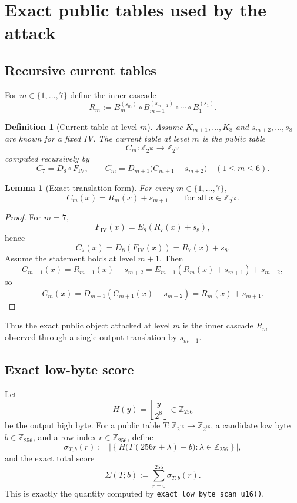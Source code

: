 \documentclass[11pt]{article}
\newtheorem{lemma}{Lemma}
\newtheorem{definition}{Definition}
\newcommand{\Z}[1]{\mathbb{Z}_{#1}}
\begin{document}
\section{Exact public tables used by the attack}
\subsection{Recursive current tables}
For $m\in\{1,\dots,7\}$ define the inner cascade
\[
R_m
:=
B_m^{(s_m)}
\circ B_{m-1}^{(s_{m-1})}
\circ \cdots \circ
B_1^{(s_1)}.
\]

\begin{definition}[Current table at level $m$]
Assume $K_{m+1},\dots,K_8$ and $s_{m+2},\dots,s_8$ are known for a fixed IV. The current table at level $m$ is the public table
\[
C_m:\Z{2^{16}}\to\Z{2^{16}}
\]
computed recursively by
\[
C_7=D_8\circ F_{\mathrm{IV}},
\qquad
C_m=D_{m+1}\bigl(C_{m+1}-s_{m+2}\bigr)
\quad (1\le m\le 6).
\]
\end{definition}

\begin{lemma}[Exact translation form]
\label{lem:current-table}
For every $m\in\{1,\dots,7\}$,
\[
C_m(x)=R_m(x)+s_{m+1}
\qquad\text{for all }x\in\Z{2^{16}}.
\]
\end{lemma}

\begin{proof}
For $m=7$,
\[
F_{\mathrm{IV}}(x)=E_8(R_7(x)+s_8),
\]
hence
\[
C_7(x)=D_8(F_{\mathrm{IV}}(x))=R_7(x)+s_8.
\]
Assume the statement holds at level $m+1$. Then
\[
C_{m+1}(x)=R_{m+1}(x)+s_{m+2}
=
E_{m+1}(R_m(x)+s_{m+1})+s_{m+2},
\]
so
\[
C_m(x)
=
D_{m+1}(C_{m+1}(x)-s_{m+2})
=
R_m(x)+s_{m+1}.
\]
\end{proof}

Thus the exact public object attacked at level $m$ is the inner cascade $R_m$ observed through a single output translation by $s_{m+1}$.

\subsection{Exact low-byte score}
Let
\[
H(y)=\left\lfloor\frac{y}{2^8}\right\rfloor\in\Z{256}
\]
be the output high byte. For a public table $T:\Z{2^{16}}\to\Z{2^{16}}$, a candidate low byte $b\in\Z{256}$, and a row index $r\in\Z{256}$, define
\[
\sigma_{T,b}(r)
:=
\left|
\left\{
H\bigl(T(256r+\lambda)-b\bigr):\lambda\in\Z{256}
\right\}
\right|,
\]
and the exact total score
\[
\Sigma(T;b):=\sum_{r=0}^{255}\sigma_{T,b}(r).
\]
This is exactly the quantity computed by \texttt{exact\_low\_byte\_scan\_u16()}.
\end{document}
